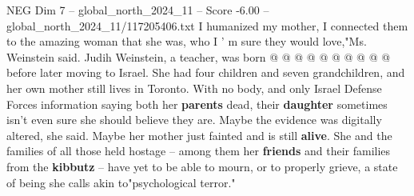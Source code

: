 \begin{textsample}{NEG Dim 7 – global\_north\_2024\_11 – Score -6.00 – global\_north\_2024\_11/117205406.txt}
I humanized my mother, I connected them to the amazing woman that she was, who I ' m sure they would love,"Ms.
Weinstein said.
Judih Weinstein, a teacher, was born @ @ @ @ @ @ @ @ @ @ before later moving to Israel.
She had four children and seven grandchildren, and her own mother still lives in Toronto.
With no body, and only Israel Defense Forces information saying both her \textbf{parents} dead, their \textbf{daughter} sometimes isn't even sure she should believe they are.
Maybe the evidence was digitally altered, she said.
Maybe her mother just fainted and is still \textbf{alive}.
She and the families of all those held hostage -- among them her \textbf{friends} and their families from the \textbf{kibbutz} -- have yet to be able to mourn, or to properly grieve, a state of being she calls akin to"psychological terror."

\end{textsample}
